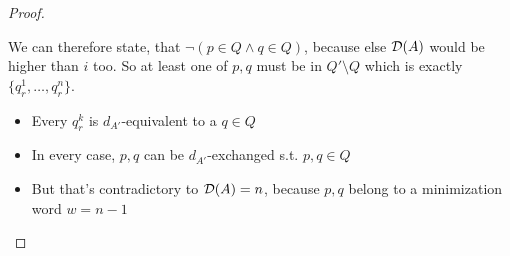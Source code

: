 \begin{proof}
\begin{description}
		
		We can therefore state, that $\neg(p \in Q \land q \in Q)$, because else $\mathcal{D}(A)$ would be higher than $i$ too.  So at least one of $p,q$ must be in $Q' \setminus Q$ which is exactly $\{ q_r^1, \ldots, q_r^n \}$.
		
		\begin{itemize}
			\item Every $q_r^k$ is $d_{A'}$-equivalent to a $q \in Q$
			\item In every case, $p,q$ can be $d_{A'}$-exchanged s.t. $p,q \in Q$
			\item But that's contradictory to $\mathcal{D}(A) = n$, because $p,q$ belong to a minimization word $w = n-1$
		\end{itemize}
		
%		
%		
%		
%		
	\end{description}
\end{proof}

